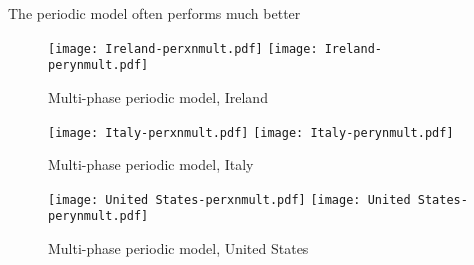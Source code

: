 The periodic model often performs much better

\begin{figure}[H]
  \texttt{[image: Ireland-perxnmult.pdf]} \label{fig:ireland-perxnmult}
\endminipage\hfill
{}
  \texttt{[image: Ireland-perynmult.pdf]} \label{fig:ireland-perynmult}
\endminipage
\caption{Multi-phase periodic model, Ireland}
\end{figure}

\begin{figure}[H]
  \texttt{[image: Italy-perxnmult.pdf]} \label{fig:italy-perxnmult}
\endminipage\hfill
{}
  \texttt{[image: Italy-perynmult.pdf]} \label{fig:italy-perynmult}
\endminipage
\caption{Multi-phase periodic model, Italy}
\end{figure}

\begin{figure}[H]
  \texttt{[image: United States-perxnmult.pdf]} \label{fig:usa-perxnmult}
\endminipage\hfill
{}
  \texttt{[image: United States-perynmult.pdf]} \label{fig:usa-perynmult}
\endminipage
\caption{Multi-phase periodic model, United States}
\end{figure}

